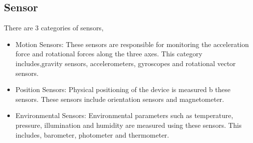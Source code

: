 \documentclass[conference]{IEEEtran}
\begin{document}
\subsection{Sensor}
There are 3 categories of sensors,
\begin{itemize}
    \item Motion Sensors: These sensors are responsible for monitoring the acceleration force and rotational forces along the three axes. This category includes,gravity sensors, accelerometers, gyroscopes and rotational vector sensors.
    \item Position Sensors: Physical positioning of the device is measured b these sensors. These sensors include orientation sensors and magnetometer. 
    \item Environmental Sensors: Environmental parameters such as temperature, pressure, illumination and humidity are measured using these sensors. This includes, barometer, photometer and thermometer.
\end{itemize}
\end{document}
